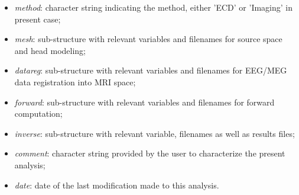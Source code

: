 \begin{itemize}
    \item \textit{method}: character string indicating the method, either 'ECD' or 'Imaging' in present case;
    \item \textit{mesh}: sub-structure with relevant variables and filenames for source space and head modeling;
    \item \textit{datareg}: sub-structure with relevant variables and filenames for EEG/MEG data registration into MRI space;
    \item \textit{forward}: sub-structure with relevant variables and filenames for forward computation;
    \item \textit{inverse}: sub-structure with relevant variable, filenames as well as results files;
    \item \textit{comment}: character string provided by the user to characterize the present analysis;
    \item \textit{date}: date of the last modification made to this analysis.
\end{itemize}

